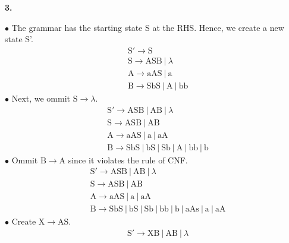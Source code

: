 \documentclass{report}
\begin{document}
{\noindent \textbf{3.} \newline
\begin{minipage}[t]{0.48\textwidth}
    $\bullet$ The grammar has the starting state S at the RHS. Hence, we create a new state S'.
    \begin{equation*}
        \begin{aligned}
            & \mathrm{S'} \longrightarrow \mathrm{S} \\
            & \mathrm{S} \longrightarrow \mathrm{ASB~|~}\lambda \\
            & \mathrm{A} \longrightarrow \mathrm{aAS~|~a} \\
            & \mathrm{B} \longrightarrow \mathrm{SbS~|~A~|~bb}
        \end{aligned}
    \end{equation*}
    $\bullet$ Next, we ommit $\mathrm{S} \longrightarrow \lambda$.
    \begin{equation*}
        \begin{aligned}
            &\mathrm{S'} \longrightarrow \mathrm{ASB~|~AB~|~}\lambda\\
            &\mathrm{S} \longrightarrow \mathrm{ASB~|~AB}\\
            &\mathrm{A} \longrightarrow \mathrm{aAS~|~a~|~aA}\\
            &\mathrm{B} \longrightarrow \mathrm{SbS~|~bS~|~Sb~|~A~|~bb~|~b}
        \end{aligned}
    \end{equation*}
    $\bullet$ Ommit $\mathrm{B} \longrightarrow \mathrm{A}$ since it violates the rule of CNF.
    \begin{equation*}
        \begin{aligned}
            &\mathrm{S'} \longrightarrow \mathrm{ASB~|~AB~|~}\lambda\\
            &\mathrm{S} \longrightarrow \mathrm{ASB~|~AB}\\
            &\mathrm{A} \longrightarrow \mathrm{aAS~|~a~|~aA}\\
            &\mathrm{B} \longrightarrow \mathrm{SbS~|~bS~|~Sb~|~bb~|~b~|~aAs~|~a~|~aA}
        \end{aligned}
    \end{equation*}
    $\bullet$ Create $\mathrm{X} \longrightarrow \mathrm{AS}$.
    \begin{equation*}
        \begin{aligned}
            &\mathrm{S'} \longrightarrow \mathrm{XB~|~AB~|~}\lambda\\

\end{aligned}
\end{equation*}
\end{minipage}}
\end{document}

